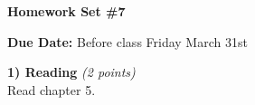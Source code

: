 

\def\xyprime{\ensuremath{\begin{pmatrix} x' \\ y' \end{pmatrix}}}



\thispagestyle{fancy}






\begin{center}
{\huge \textbf{Homework Set \#7}}
\large

{\textbf{ Due Date:} Before class Friday March 31st  }
\end{center}

\textbf{1) Reading } \hfill \textit{(2 points)}\\
Read chapter 5.


